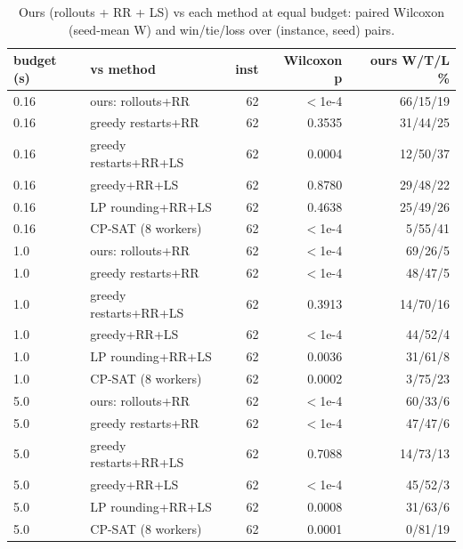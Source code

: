 \begin{table}[t]
\centering
\caption{Ours (rollouts + RR + LS) vs each method at equal budget: paired Wilcoxon (seed-mean W) and win/tie/loss over (instance, seed) pairs.}
\label{tab:equal_time_tests}
\scriptsize
\begin{tabular}{llrrr}
\toprule
budget (s) & vs method & inst & Wilcoxon p & ours W/T/L \% \\
\midrule
0.16 & ours: rollouts+RR & 62 & $<$1e-4 & 66/15/19 \\
0.16 & greedy restarts+RR & 62 & 0.3535 & 31/44/25 \\
0.16 & greedy restarts+RR+LS & 62 & 0.0004 & 12/50/37 \\
0.16 & greedy+RR+LS & 62 & 0.8780 & 29/48/22 \\
0.16 & LP rounding+RR+LS & 62 & 0.4638 & 25/49/26 \\
0.16 & CP-SAT (8 workers) & 62 & $<$1e-4 & 5/55/41 \\
1.0 & ours: rollouts+RR & 62 & $<$1e-4 & 69/26/5 \\
1.0 & greedy restarts+RR & 62 & $<$1e-4 & 48/47/5 \\
1.0 & greedy restarts+RR+LS & 62 & 0.3913 & 14/70/16 \\
1.0 & greedy+RR+LS & 62 & $<$1e-4 & 44/52/4 \\
1.0 & LP rounding+RR+LS & 62 & 0.0036 & 31/61/8 \\
1.0 & CP-SAT (8 workers) & 62 & 0.0002 & 3/75/23 \\
5.0 & ours: rollouts+RR & 62 & $<$1e-4 & 60/33/6 \\
5.0 & greedy restarts+RR & 62 & $<$1e-4 & 47/47/6 \\
5.0 & greedy restarts+RR+LS & 62 & 0.7088 & 14/73/13 \\
5.0 & greedy+RR+LS & 62 & $<$1e-4 & 45/52/3 \\
5.0 & LP rounding+RR+LS & 62 & 0.0008 & 31/63/6 \\
5.0 & CP-SAT (8 workers) & 62 & 0.0001 & 0/81/19 \\
\bottomrule
\end{tabular}
\end{table}
